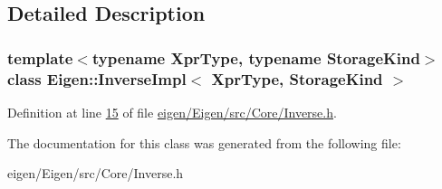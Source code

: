 \subsection{Detailed Description}
\subsubsection*{template$<$typename Xpr\+Type, typename Storage\+Kind$>$\newline
class Eigen\+::\+Inverse\+Impl$<$ Xpr\+Type, Storage\+Kind $>$}



Definition at line \hyperlink{eigen_2_eigen_2src_2_core_2_inverse_8h_source_l00015}{15} of file \hyperlink{eigen_2_eigen_2src_2_core_2_inverse_8h_source}{eigen/\+Eigen/src/\+Core/\+Inverse.\+h}.



The documentation for this class was generated from the following file\+:\begin{DoxyCompactItemize}
\item 
eigen/\+Eigen/src/\+Core/\+Inverse.\+h\end{DoxyCompactItemize}
